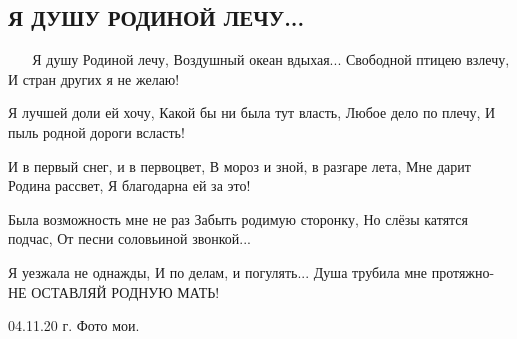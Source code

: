  
 
 

\subsection{Я ДУШУ РОДИНОЙ ЛЕЧУ...}

🍂🌿🍁🌿🍁
Я душу Родиной лечу,
Воздушный океан вдыхая...
Свободной птицею взлечу,
И стран других я не желаю!

Я лучшей доли ей хочу,
Какой бы ни была тут власть,
Любое дело по плечу,
И пыль родной дороги всласть!

И в первый снег, и в первоцвет,
В мороз и зной, в разгаре лета,
Мне дарит Родина рассвет,
Я благодарна ей за это!

Была возможность мне не раз
Забыть родимую сторонку,
Но слёзы катятся подчас,
От песни соловьиной звонкой...

Я уезжала не однажды,
И по делам, и погулять...
Душа трубила мне протяжно-
НЕ ОСТАВЛЯЙ РОДНУЮ МАТЬ!
 
04.11.20 г.
Фото мои.
